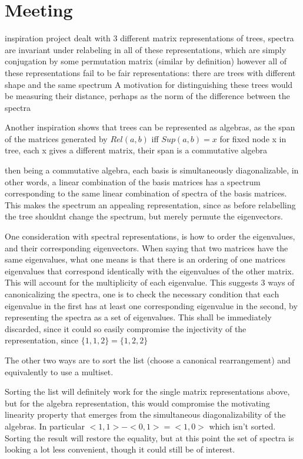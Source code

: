 \documentclass{report}
\begin{document}
\section{Meeting}

inspiration project dealt with 3 different matrix representations of trees,
spectra are invariant under relabeling in all of these representations, which
are simply conjugation by some permutation matrix (similar by definition)
however all of these representations fail to be fair representations: there are
trees with different shape and the same spectrum A motivation for
distinguishing these trees would be measuring their distance, perhaps as the
norm of the difference between the spectra

Another inspiration shows that trees can be represented as algebras, as the
span of the matrices generated by $Rel(a, b)$ iff $Sup(a, b) = x$ for fixed
node x in tree, each x gives a different matrix, their span is a commutative
algebra

then being a commutative algebra, each basis is simultaneously diagonalizable,
in other words, a linear combination of the basis matrices has a spectrum
corresponding to the same linear combination of spectra of the basis matrices.
This makes the spectrum an appealing representation, since as before
relabelling the tree shouldnt change the spectrum, but merely permute the
eigenvectors.

One consideration with spectral representations, is how to order the
eigenvalues, and their corresponding eigenvectors.  When saying that two
matrices have the same eigenvalues, what one means is that there is an ordering
of one matrices eigenvalues that correspond identically with the eigenvalues of
the other matrix. This will account for the multiplicity of each eigenvalue.
This suggests 3 ways of canonicalizing the spectra, one is to check the
necessary condition that each eigenvalue in the first has at least one
corresponding eigenvalue in the second, by representing the spectra as a set
of eigenvalues. This shall be immediately discarded, since it could so easily
compromise the injectivity of the representation, since
$\{1, 1, 2\} = \{1, 2, 2\}$

The other two ways are to sort the list (choose a canonical rearrangement) and
equivalently to use a multiset.

Sorting the list will definitely work for the single matrix representations
above, but for the algebra representation, this would compromise the
motivating linearity property that emerges from the simultaneous
diagonalizability of the algebras.
In particular $<1, 1> - <0, 1> = <1, 0>$ which isn't sorted.
Sorting the result will restore the equality, but at this point the set of
spectra is looking a lot less convenient, though it could still be of interest.
\end{document}
